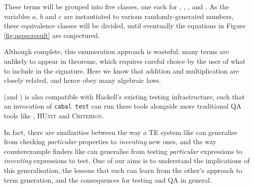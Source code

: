 These terms will be grouped into five classes, one each for ,
, ,  and . As the
variables $a$, $b$ and $c$ are instantiated to various randomly-generated
numbers, these equivalence classes will be divided, until eventually the
equations in Figure \ref{fig:qspecresult} are conjectured.

Although complete, this enumeration approach is wasteful: many terms are
unlikely to appear in theorems, which requires careful choice by the user of
what to include in the signature. Here we know that addition and multiplication
are closely related, and hence obey many algebraic laws.

\qspec{} (and \hspec{}) is also compatible with Haskell's existing testing
infrastructure, such that an invocation of \texttt{cabal test} can run these
tools alongside more traditional QA tools like \qcheck{}, \textsc{HUnit} and
\textsc{Criterion}.

In fact, there are similarities between the way a TE system like \qspec{} can
generalise from checking \emph{particular} properties to \emph{inventing} new
ones, and the way counterexample finders like \qcheck{} can generalise from
testing \emph{particular} expressions to \emph{inventing} expressions to
test. One of our aims is to understand the implications of this generalisation,
the lessons that each can learn from the other's approach to term generation,
and the consequences for testing and QA in general.





